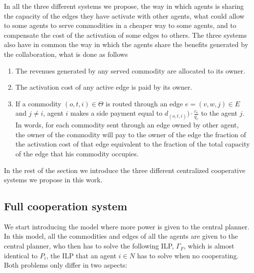 \documentclass[review]{elsarticle}
\begin{document}
In all the three different systems we propose, the way in which agents is sharing the capacity of the edges they have activate with other agents, what could allow to some agents to serve commodities in a cheaper way to some agents, and to compensate the cost of the activation of some edges to others. The three systems also have in common the way in which the agents share the benefits generated by the collaboration, what is done as follows
\begin{enumerate}
    \item The revenues generated by any served commodity are
    allocated to its owner.
    \item The activation cost of any active edge is paid by its owner.
    \item If a commodity $(o,t,i)\in \Theta$ is routed through an edge $e=(v,w,j)		\in E$ and $j\not = i$, agent $i$ makes a side payment equal to $d_{(o,t,i)})		\cdot\frac{c_e}{q_e}$ to the agent $j$. In words, for each commodity sent 		through an edge owned by other agent, the owner of the commodity will pay to 		the owner of the edge the fraction of the activation cost of that edge 			equivalent 	to the fraction of the total capacity of the edge that his 			commodity occupies.
\end{enumerate}

In the rest of the section we introduce the three different centralized
cooperative systems we propose in this work.


\subsection{Full cooperation system}

We start introducing the model where more power is given to the central planner.
In this model, all the commodities and edges of all the agents are given to the
central planner, who then has to solve the following ILP, $\Gamma_F$, which is almost identical to $P_ i$, the ILP that an
agent $i\in N$ has to solve when no cooperating. Both problems only differ in
two aspects:
\end{document}
